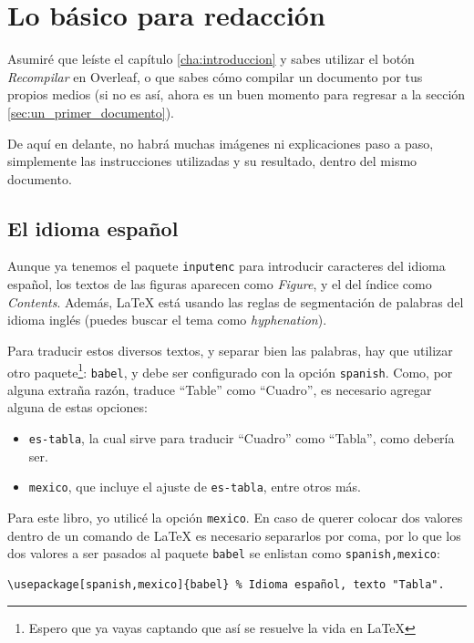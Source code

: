\chapter{Lo básico para redacción}
\label{cha:lo_basico}


Asumiré que leíste el capítulo \ref{cha:introduccion} y sabes utilizar el botón \emph{Recompilar} en Overleaf, o que sabes cómo compilar un documento por tus propios medios (si no es así, ahora es un buen momento para regresar a la sección \ref{sec:un_primer_documento}).

De aquí en delante, no habrá muchas imágenes ni explicaciones paso a paso, simplemente las instrucciones utilizadas y su resultado, dentro del mismo documento.



\section{El idioma español}
\label{sec:el_idioma_espanol}



Aunque ya tenemos el paquete \texttt{inputenc} para introducir caracteres del idioma español, los textos de las figuras aparecen como \emph{Figure}, y el del índice como \emph{Contents}. Además, \LaTeX{} está usando las reglas de segmentación de palabras del idioma inglés (puedes buscar el tema como \emph{hyphenation}).

Para traducir estos diversos textos, y separar bien las palabras, hay que utilizar otro paquete\footnote{Espero que ya vayas captando que así se resuelve la vida en \LaTeX{}}: \texttt{babel}, y debe ser configurado con la opción \texttt{spanish}. Como, por alguna extraña razón, traduce ``Table'' como ``Cuadro'', es necesario agregar alguna de estas opciones:
\begin{itemize}
	\item \texttt{es-tabla}, la cual sirve para traducir ``Cuadro'' como ``Tabla'', como debería ser.
	\item \texttt{mexico}, que incluye el ajuste de \texttt{es-tabla}, entre otros más.
\end{itemize}

Para este libro, yo utilicé la opción \texttt{mexico}. En caso de querer colocar dos valores dentro de un comando de \LaTeX{} es necesario separarlos por coma, por lo que los dos valores a ser pasados al paquete \texttt{babel} se enlistan como \texttt{spanish,mexico}:

\begin{lstlisting}[style=latex,numbers=none]
\usepackage[spanish,mexico]{babel} % Idioma español, texto "Tabla".
\end{lstlisting}

